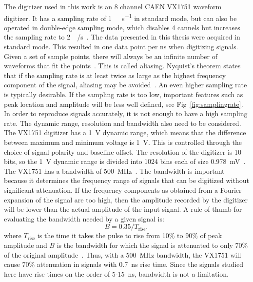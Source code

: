\documentclass[main.tex]{subfiles}
\begin{document}
The digitizer used in this work is an 8 channel CAEN VX1751 waveform digitizer. It has a sampling rate of \si{1\giga\sample\per\second} in standard mode, but can also be operated in double-edge sampling mode, which disables 4 cannels but increases the sampling rate to \SI{2}{\giga\sample/\second}~\cite{CAEN}. The data presented in this thesis were acquired in standard mode. This resulted in one data point per \si{ns} when digitizing signals. Given a set of sample points, there will always be an infinite number of waveforms that fit the points~\cite{Spectrum}. This is called aliasing. Nyquist's theorem states that if the sampling rate is at least twice as large as the highest frequency component of the signal, aliasing may be avoided~\cite{Spectrum}. An even higher sampling rate is typically desirable. If the sampling rate is too low, important features such as peak location and amplitude will be less well defined, see Fig~\ref{fig:samplingrate}.
In order to reproduce signals accurately, it is not enough to have a high sampling rate. The dynamic range, resolution and bandwidth also need to be considered. 
The VX1751 digitizer has a \SI{1}{\volt} dynamic range, which means that the difference between maximum and minimum voltage is \SI{1}{\volt}. This is controlled through the choice of signal polarity and baseline offset. The resolution of the digitizer is 10 bits, so the \si{1\volt} dynamic range is divided into 1024 bins each of size \SI{0.978}{\milli\volt}~\cite{CAEN}.
The VX1751 has a bandwidth of \SI{500}{\mega\hertz}~\cite{CAEN}. The bandwidth is important because it determines the frequency range of signals that can be digitized without significant attenuation. If the frequency components as obtained from a Fourier expansion of the signal are too high, then the amplitude recorded by the digitizer will be lower than the actual amplitude of the input signal. A rule of thumb for evaluating the bandwidth needed by a given signal is:
\begin{equation}
\label{eq:bandwidth}
B=0.35/T_{\textrm{rise}},
\end{equation}
where $T_\textrm{rise}$ is the time it takes the pulse to rise from 10\% to 90\% of peak amplitude and $B$ is the bandwidth for which the signal is attenuated to only 70\% of the original amplitude~\cite{Leo}. Thus, with a \SI{500}{MHz} bandwidth, the VX1751 will cause 70\% attenuation in signals with \SI{0.7}{ns} rise time. Since the signals studied here have rise times on the order of 5-\SI{15}{ns}, bandwidth is not a limitation.
\end{document}
